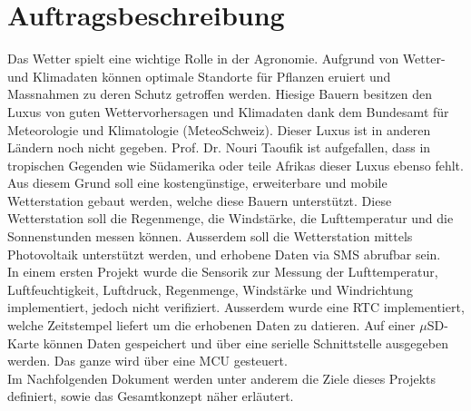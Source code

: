 \section*{Auftragsbeschreibung}
Das Wetter spielt eine wichtige Rolle in der Agronomie. Aufgrund von Wetter- und Klimadaten können optimale Standorte für Pflanzen eruiert und Massnahmen zu deren Schutz getroffen werden. Hiesige Bauern besitzen den Luxus von guten Wettervorhersagen und Klimadaten dank dem Bundesamt für Meteorologie und Klimatologie (MeteoSchweiz). Dieser Luxus ist in anderen Ländern noch nicht gegeben. Prof. Dr. Nouri Taoufik ist aufgefallen, dass in tropischen Gegenden wie Südamerika oder teile Afrikas dieser Luxus ebenso fehlt. \\[0.5cm]
Aus diesem Grund soll eine kostengünstige, erweiterbare und mobile Wetterstation gebaut werden, welche diese Bauern unterstützt. Diese Wetterstation soll die Regenmenge, die Windstärke, die Lufttemperatur und die Sonnenstunden messen können. Ausserdem soll die Wetterstation mittels Photovoltaik unterstützt werden, und erhobene Daten via SMS abrufbar sein. \\[0.5cm]
In einem ersten Projekt wurde die Sensorik zur Messung der Lufttemperatur, Luftfeuchtigkeit, Luftdruck, Regenmenge, Windstärke und Windrichtung implementiert, jedoch nicht verifiziert. Ausserdem wurde eine RTC implementiert, welche Zeitstempel liefert um die erhobenen Daten zu datieren. Auf einer $\mu$SD-Karte können Daten gespeichert und über eine serielle Schnittstelle ausgegeben werden. Das ganze wird über eine MCU gesteuert. \\[0.5cm]
Im Nachfolgenden Dokument werden unter anderem die Ziele dieses Projekts definiert, sowie das Gesamtkonzept näher erläutert. 
